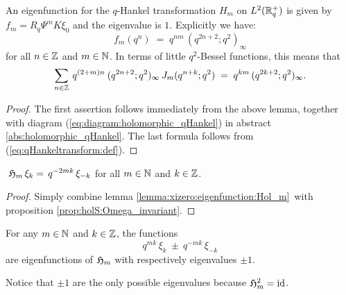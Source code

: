 \begin{cor}
An eigenfunction for the\/ $q$-Hankel transformation\/ $H_m$ on\/ $L^2(\mathbb{R}_q^+)$ is given by\/
$f_m = R_q \Psi^m K \xi_0$\/ and the eigenvalue is\/ $1$. Explicitly we have:
$$  f_m(q^n) \;=\;   q^{nm} \, (q^{2n+2} ; q^2)_\infty $$
for all\/ $n\in \mathbb{Z}$ and\/ $m\in \mathbb{N}$.
In terms of little\/ $q^2$-Bessel functions, this means that
$$   \sum_{n\in \mathbb{Z}} \: q^{(2+m)n} \: (q^{2n+2} ; q^2)_\infty \, J_{m}(q^{n+k}; q^2)
     \;=\;   q^{km} \, (q^{2k+2} ; q^2)_\infty.  $$
\end{cor}
\begin{proof}
The first assertion follows immediately from the above lemma, together with
diagram (\ref{eq:diagram:holomorphic_qHankel}) in abstract \ref{abs:holomorphic_qHankel}\@.
The last formula follows from (\ref{eq:qHankeltransform:def}).
\end{proof}



\begin{prop} \label{prop:Hankel:on:basis}
$\; \mathfrak{H}_{m} \, \xi_k = \, q^{-2mk} \, \xi_{-k}$ for all\/ $m\in \mathbb{N}$ and\/ $k\in \mathbb{Z}$.
\end{prop}
\begin{proof}
Simply combine lemma \ref{lemma:xizero:eigenfunction:Hol_m}\
with proposition \ref{prop:holS:Omega_invariant}\@.
\end{proof}


\begin{cor}
For any\/ $m\in \mathbb{N}$ and\/ $k\in \mathbb{Z}$, the functions
$$   q^{mk} \, \xi_k  \: \pm \: q^{-mk} \, \xi_{-k}  $$
are eigenfunctions of\/ $\mathfrak{H}_{m}$ with respectively eigenvalues $\pm 1$.
\end{cor}

Notice that $\pm 1$ are the only possible eigenvalues because $\mathfrak{H}_{m}^2 = \mbox{\rm id}$.
